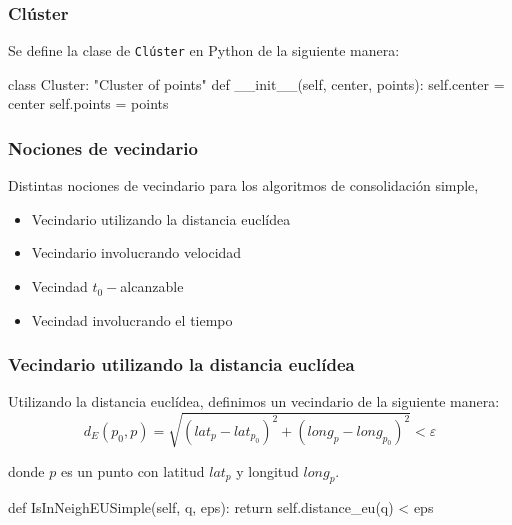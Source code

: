 \documentclass[10pt, spanish]{beamer}
\begin{document}
\begin{frame}[fragile]
\frametitle{Cl\'uster}
Se define la clase de \texttt{Cl\'uster} en Python de la siguiente manera:\\
\bigskip
\begin{python}
class Cluster:
	"Cluster of points"
	def __init__(self, center, points):
		self.center = center
		self.points = points
\end{python}

\end{frame}



\begin{frame}[fragile]
\frametitle{Nociones de vecindario}

Distintas nociones de vecindario para los algoritmos de consolidaci\'on simple,
\begin{itemize}
	\item Vecindario utilizando la distancia eucl\'idea
	\item Vecindario involucrando velocidad
	\item Vecindad $t_0-$alcanzable
	\item Vecindad involucrando el tiempo
\end{itemize}
\end{frame}

\begin{frame}[fragile]
\frametitle{Vecindario utilizando la distancia eucl\'idea}

Utilizando la distancia eucl\'idea, definimos un vecindario de la siguiente manera:\\

$$ d_E(p_0, p) = \sqrt{(lat_{p} - lat_{p_0})^2 + (long_{p} - long_{p_0})^2 } < \varepsilon $$

donde $p$ es un punto con latitud $lat_{p}$ y longitud $long_{p}$.\\

\bigskip
\begin{python}
        def IsInNeighEUSimple(self, q, eps):
                return self.distance_eu(q) < eps
\end{python}

\end{frame}

\end{document}
